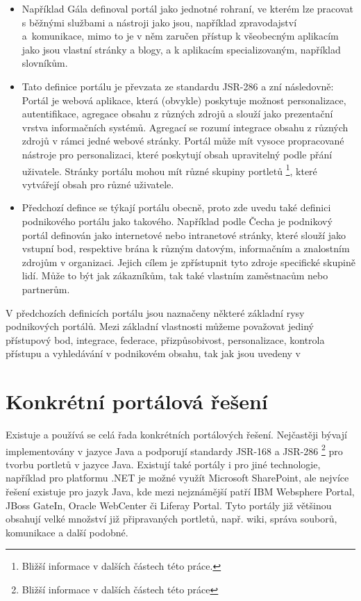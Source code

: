 \documentclass{fithesis}
\begin{document}
\begin{itemize}

\item Například Gála definoval portál jako jednotné rohraní, ve kterém lze pracovat s běžnými službami a nástroji jako jsou, například zpravodajství a~komunikace, mimo to je v něm zaručen přístup k všeobecným aplikacím jako jsou vlastní stránky a blogy, a k aplikacím specializovaným, například slovníkům. \cite{gala}

\item Tato definice portálu je převzata ze standardu JSR-286 a zní následovně: Portál je webová aplikace, která (obvykle) poskytuje možnost personalizace, autentifikace, agregace obsahu z různých zdrojů a slouží jako prezentační vrstva informačních systémů. Agregací se rozumí integrace obsahu z různých zdrojů v rámci jedné webové stránky. Portál může mít vysoce propracované nástroje pro personalizaci, které poskytují obsah upravitelný podle přání uživatele. Stránky portálu mohou mít různé skupiny portletů \footnote[1]{Bližší informace v dalších částech této práce.}, které vytvářejí obsah pro různé uživatele.  \cite{jsr-286}

\item Předchozí defince se týkají portálu obecně, proto zde uvedu také definici podnikového portálu jako takového. Například podle Čecha je podnikový portál definován jako internetové nebo intranetové stránky, které slouží jako vstupní bod, respektive brána k různým datovým, informačním a znalostním zdrojům v organizaci. Jejich cílem je zpřístupnit tyto zdroje specifické skupině lidí. Může to být jak zákazníkům, tak také vlastním zaměstnacům nebo partnerům. \cite{cech}

\end{itemize}

V předchozích definicích portálu jsou naznačeny některé základní rysy podnikových portálů. Mezi základní vlastnosti můžeme považovat jediný přístupový bod, integrace, federace, přizpůsobivost, personalizace, kontrola přístupu a vyhledávání v podnikovém obsahu, tak jak jsou uvedeny v \cite{enterprise-portal} 

\section{Konkrétní portálová řešení}
Existuje a používá se celá řada konkrétních portálových řešení. Nejčastěji bývají implementovány v jazyce Java a podporují standardy JSR-168 a JSR-286 \footnote[2]{Bližší informace v dalších částech této práce} pro tvorbu portletů v jazyce Java. Existují také portály i pro jiné technologie, například pro platformu .NET je možné využít Microsoft SharePoint, ale nejvíce řešení existuje pro jazyk Java, kde mezi nejznámější patří IBM Websphere Portal, JBoss GateIn, Oracle WebCenter či Liferay Portal. Tyto portály již většinou obsahují velké množství již připravaných portletů, např. wiki, správa souborů, komunikace a další podobné.
\end{document}
